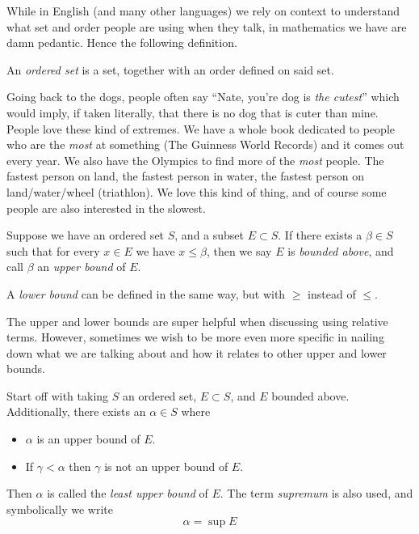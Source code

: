 While in English (and many other languages) we rely on context to understand
what set and order people are using when they talk, in mathematics we have are
damn pedantic. Hence the following definition.

\begin{definition}\label{def:ordered-set}
    An \emph{ordered set} is a set, together with an order defined on said set.
\end{definition}

Going back to the dogs, people often say ``Nate, you're dog is \emph{the
    cutest}'' which would imply, if taken literally, that there is no dog that is
cuter than mine. People love these kind of extremes. We have a whole book
dedicated to people who are the \emph{most} at something (The Guinness World
Records) and it comes out every year. We also have the Olympics to find more of
the \emph{most} people. The fastest person on land, the fastest person in
water, the fastest person on land/water/wheel (triathlon). We love this kind of
thing, and of course some people are also interested in the slowest.

\begin{definition}\label{def:upper-bound}
    Suppose we have an ordered set $S$, and a subset $E\subset S$. If there
    exists a $\beta\in S$ such that for every $x\in E$ we have $x\leq\beta$,
    then we say $E$ is \emph{bounded above}, and call $\beta$ an \emph{upper
        bound} of $E$.
\end{definition}

A \emph{lower bound} can be defined in the same way, but with $\geq$ instead of
$\leq$.

The upper and lower bounds are super helpful when discussing using relative
terms. However, sometimes we wish to be more even more specific in nailing down
what we are talking about and how it relates to other upper and lower bounds.

\begin{definition}\label{def:least-upper-bound}
    Start off with taking $S$ an ordered set, $E\subset S$, and $E$ bounded
    above. Additionally, there exists an $\alpha\in S$ where
    \begin{itemize}
        \item $\alpha$ is an upper bound of $E$.
        \item If $\gamma < \alpha$ then $\gamma$ is not an upper bound of $E$.
    \end{itemize}
    Then $\alpha$ is called the \emph{least upper bound} of $E$. The term
    \emph{supremum} is also used, and symbolically we write
    \[\alpha = \sup{E}\]
\end{definition}

